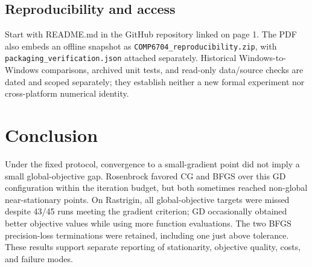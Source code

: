 \documentclass[10pt]{article}
\begin{document}
\setcounter{section}{9}
\setcounter{subsection}{0}
\subsection{Reproducibility and access}
Start with README.md in the GitHub repository linked on page 1. The PDF also embeds an offline snapshot as \texttt{COMP6704\_reproducibility.zip}, with \texttt{packaging\_verification.json} attached separately. Historical Windows-to-Windows comparisons, archived unit tests, and read-only data/source checks are dated and scoped separately; they establish neither a new formal experiment nor cross-platform numerical identity.

\setcounter{section}{9}
\section{Conclusion}
Under the fixed protocol, convergence to a small-gradient point did not imply a small global-objective gap. Rosenbrock favored CG and BFGS over this GD configuration within the iteration budget, but both sometimes reached non-global near-stationary points. On Rastrigin, all global-objective targets were missed despite 43/45 runs meeting the gradient criterion; GD occasionally obtained better objective values while using more function evaluations. The two BFGS precision-loss terminations were retained, including one just above tolerance. These results support separate reporting of stationarity, objective quality, costs, and failure modes.
\end{document}

